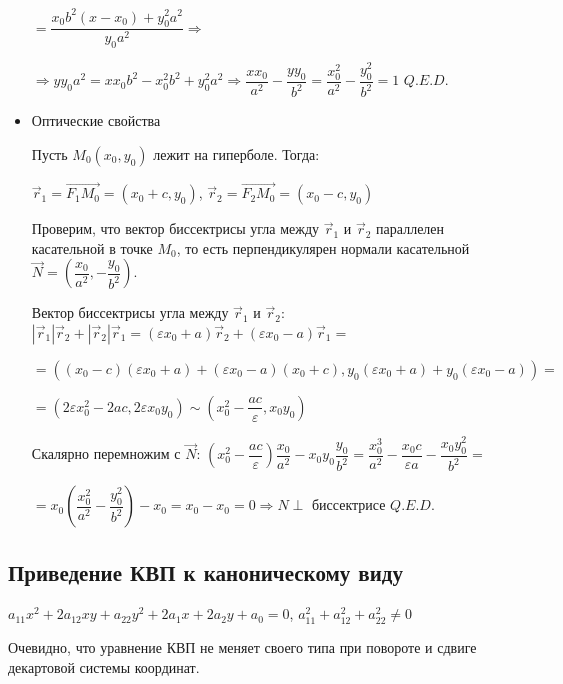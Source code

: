 \begin{itemize}
          \(= \dfrac{x_0 b^2 (x - x_0) + y_0^2 a^2}{y_0 a^2} \Rightarrow\)

          \(\Rightarrow y y_0 a^2 = x x_0 b^2 - x_0^2 b^2 + y_0^2 a^2 \Rightarrow \dfrac{x x_0}{a^2} - \dfrac{y y_0}{b^2} = \dfrac{x_0^2}{a^2} - \dfrac{y_0^2}{b^2} = 1\) \(Q.E.D.\)

    \item Оптические свойства

          Пусть \(M_0(x_0, y_0)\) лежит на гиперболе. Тогда:

          \(\vec r_1 = \overrightarrow{F_1 M_0} = (x_0 + c, y_0)\), \(\vec r_2 = \overrightarrow{F_2 M_0} = (x_0 - c, y_0)\)

          Проверим, что вектор биссектрисы угла между \(\vec r_1\) и \(\vec r_2\) параллелен касательной в точке \(M_0\), то есть перпендикулярен нормали касательной \(\vec N = \left(\dfrac{x_0}{a^2}, -\dfrac{y_0}{b^2}\right)\).

          Вектор биссектрисы угла между \(\vec r_1\) и \(\vec r_2\): \(|\vec r_1|\vec r_2 + |\vec r_2| \vec r_1 = (\varepsilon x_0 + a) \vec r_2 + (\varepsilon x_0 - a) \vec r_1 =\)

          \(=((x_0 - c)(\varepsilon x_0 + a) + (\varepsilon x_0 - a)(x_0 + c), y_0(\varepsilon x_0 + a) + y_0(\varepsilon x_0 - a)) =\)

          \(= (2\varepsilon x_0^2 - 2ac, 2 \varepsilon x_0 y_0) \sim \left(x_0^2 - \dfrac{ac}{\varepsilon}, x_0 y_0\right)\)

          Скалярно перемножим с \(\vec N\): \(\left(x_0^2 - \dfrac{ac}{\varepsilon}\right)\dfrac{x_0}{a^2} - x_0 y_0 \dfrac{y_0}{b^2} = \dfrac{x_0^3}{a^2} - \dfrac{x_0 c}{\varepsilon a} - \dfrac{x_0 y_0^2}{b^2} =\)

          \(= x_0 \left(\dfrac{x_0^2}{a^2} - \dfrac{y_0^2}{b^2}\right) - x_0 = x_0 - x_0 = 0 \Rightarrow N \perp\) биссектрисе \(Q.E.D.\)
\end{itemize}
\newpage
\subsection{Приведение КВП к каноническому виду}
\(a_{11} x^2 + 2 a_{12} x y + a_{22} y^2 + 2 a_1 x + 2 a_2 y + a_0 = 0\), \(a_{11}^2 + a_{12}^2 + a_{22}^2 \neq 0\)

Очевидно, что уравнение КВП не меняет своего типа при повороте и сдвиге декартовой системы координат.

